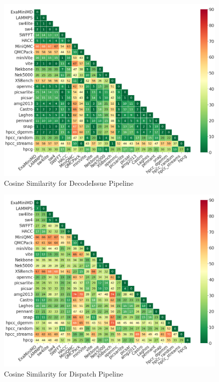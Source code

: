 \documentclass[conference]{IEEEtran}
\begin{document}
\begin{figure}[ht]
\centering
\includegraphics[width=0.9\linewidth]{figs/DecodeIssue_Pipeline.png}
\caption{Cosine Similarity for DecodeIssue Pipeline }
\label{figs:cosine DecodeIssue_Pipeline}
\end{figure}

\begin{figure}[ht]
\centering
\includegraphics[width=0.9\linewidth]{figs/Dispatch_Pipeline.png}
\caption{Cosine Similarity for Dispatch Pipeline }
\label{figs:cosine Dispatch_Pipeline}
\end{figure}
\end{document}
